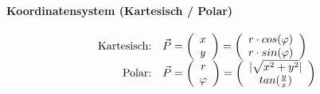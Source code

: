 	\paragraph{Koordinatensystem (Kartesisch / Polar)}
		\begin{align*}
			\begin{array}{r l}
				\text{Kartesisch:} & \vec{P} = \left(\begin{array}{c} x \\ y \end{array}\right) = \left(\begin{array}{c} r \cdot cos(\varphi ) \\ r \cdot sin(\varphi) \end{array}\right) \\
				\text{Polar:} & \vec{P} = \left(\begin{array}{c} r \\ \varphi \end{array}\right) = \left(\begin{array}{c} |\sqrt{x^2 + y^2}| \\ tan(\frac{y}{x}) \end{array}\right) \\
			\end{array}
		\end{align*}
	


\vfill\null
\pagebreak